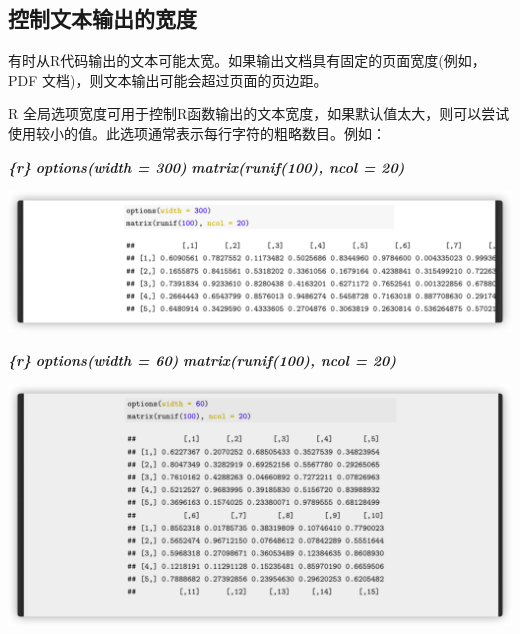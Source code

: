 \documentclass[
]{book}
\newenvironment{Shaded}{\begin{snugshade}}{\end{snugshade}}
\newcommand{\InformationTok}[1]{\textcolor[rgb]{0.56,0.35,0.01}{\textbf{\textit{#1}}}}
\begin{document}
\hypertarget{ux63a7ux5236ux6587ux672cux8f93ux51faux7684ux5bbdux5ea6}{%
\subsection{控制文本输出的宽度}\label{ux63a7ux5236ux6587ux672cux8f93ux51faux7684ux5bbdux5ea6}}

有时从R代码输出的文本可能太宽。如果输出文档具有固定的页面宽度(例如， PDF
文档)，则文本输出可能会超过页面的页边距。

R
全局选项宽度可用于控制R函数输出的文本宽度，如果默认值太大，则可以尝试使用较小的值。此选项通常表示每行字符的粗略数目。例如：

\begin{Shaded}
\begin{Highlighting}[]
\InformationTok{\textasciigrave{}\textasciigrave{}\textasciigrave{}\{r\} }
\InformationTok{options(width = 300)}
\InformationTok{matrix(runif(100), ncol = 20)}
\InformationTok{\textasciigrave{}\textasciigrave{}\textasciigrave{}}
\end{Highlighting}
\end{Shaded}

\includegraphics{images/paste-5127AF6C.png}

\begin{Shaded}
\begin{Highlighting}[]
\InformationTok{\textasciigrave{}\textasciigrave{}\textasciigrave{}\{r\}}
\InformationTok{options(width = 60)}
\InformationTok{matrix(runif(100), ncol = 20)}
\InformationTok{\textasciigrave{}\textasciigrave{}\textasciigrave{}}
\end{Highlighting}
\end{Shaded}

\includegraphics{images/paste-17F40901.png}
\end{document}
